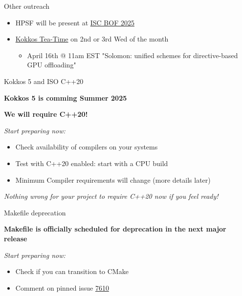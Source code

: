 \begin{frame}[fragile]{Other outreach}
  \begin{itemize}
    \item{HPSF will be present at \href{https://isc.app.swapcard.com/widget/event/isc-high-performance-2025/planning/UGxhbm5pbmdfMjU4NjE0MQ==}{ISC BOF 2025}}
\item{\href{https://kokkos.org/community/tea-time/}{Kokkos Tea-Time} on 2nd or 3rd Wed of the month} 
  \begin{itemize}
      \item April 16th @ 11am EST "Solomon: unified schemes for directive-based GPU offloading"
  \end{itemize}
\end{itemize}

\end{frame}


\begin{frame}[fragile]{Kokkos 5 and ISO C++20}
\begin{center}
\textbf{Kokkos 5 is comming Summer 2025}

\vspace{0.5cm}
\textbf{We will require C++20!}
\end{center}

\textit{Start preparing now:}
\begin{itemize}
  \item{Check availability of compilers on your systems}
  \item{Test with C++20 enabled: start with a CPU build}
  \item{Minimum Compiler requirements will change (more details later)}
\end{itemize}

\vspace{0.5cm}
\begin{center}
\textit{Nothing wrong for your project to require C++20 now if you feel ready!}
\end{center}
\end{frame}

\begin{frame}[fragile]{Makefile deprecation}
\begin{center}
\textbf{Makefile is officially scheduled for deprecation in the next major release}

\textit{Start preparing now:}
\begin{itemize}
  \item{Check if you can transition to CMake}
  \item{Comment on pinned issue \href{https://github.com/kokkos/kokkos/issues/7610}{7610}}
\end{itemize}
\end{center}

\end{frame}

